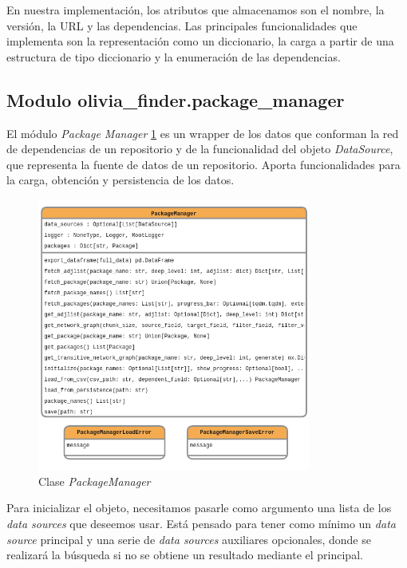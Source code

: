 En nuestra implementación, los atributos que almacenamos son el nombre, la versión, la URL y las
dependencias. Las principales funcionalidades que implementa son la representación como un
diccionario, la carga a partir de una estructura de tipo diccionario y la enumeración de las
dependencias.

\subsection{Modulo olivia\_finder.package\_manager}

El módulo \textit{Package Manager} \ref{fig:package_manager} es un wrapper de los datos que conforman la red de dependencias de
un repositorio y de la funcionalidad del objeto \textit{DataSource}, que representa la fuente de
datos de un repositorio. Aporta funcionalidades para la carga, obtención y persistencia de los datos.

\begin{figure}[h!]
    \centering
    \includegraphics[width=0.8\textwidth]{img/anexos/package_manager.png}
    \caption{Clase \textit{PackageManager}}
    \label{fig:package_manager}
\end{figure}

Para inicializar el objeto, necesitamos pasarle como argumento una lista de los \textit{data sources}
que deseemos usar. Está pensado para tener como mínimo un \textit{data source} principal y una serie
de \textit{data sources} auxiliares opcionales, donde se realizará la búsqueda si no se obtiene un
resultado mediante el principal.

